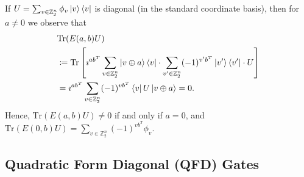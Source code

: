 \documentclass[twoside,romanappendices]{IEEEtran}
\newcommand{\ket}[1]{\left\lvert #1 \right\rangle}
\newcommand{\bra}[1]{\left\langle #1 \right\rvert}
\begin{document}
If $U = \sum_{v \in \mathbb{Z}_2^n} \phi_v \ketbra{v}$ is diagonal (in the standard coordinate basis), then for $a \neq 0$ we observe that
\begin{align}
& \text{Tr}(E(a,b) U) \nonumber \\
%
  & \coloneqq \text{Tr}\left[ \imath^{ab^T} \sum_{v \in \mathbb{Z}_2^n} \ketbra{v \oplus a}{v} \cdot \sum_{v' \in \mathbb{Z}_2^n} (-1)^{v'b^T} \ketbra{v'} \cdot U \right] \\
%
  & = \imath^{ab^T} \sum_{v \in \mathbb{Z}_2^n} (-1)^{vb^T} \bra{v} U \ket{v \oplus a} = 0.
%
\end{align}
Hence, $\text{Tr}(E(a,b) U) \neq 0$ if and only if $a = 0$, and $\text{Tr}(E(0,b) U) = \sum_{v \in \mathbb{Z}_2^n} (-1)^{vb^T} \phi_{v}$.


\subsection{Quadratic Form Diagonal (QFD) Gates}
\label{sec:QFD_gates}
\end{document}
